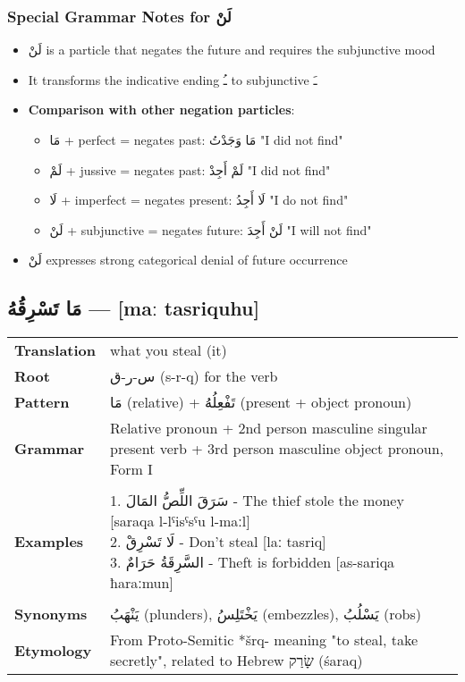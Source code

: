 \documentclass[letterpaper,12pt]{article}
\begin{document}
\subsubsection*{Special Grammar Notes for \textarabic{لَنْ}}
\begin{itemize}
  \item \textarabic{لَنْ} is a particle that negates the future and requires the subjunctive mood
  \item It transforms the indicative ending \textarabic{ـُ} to subjunctive \textarabic{ـَ}
  \item \textbf{Comparison with other negation particles}:
    \begin{itemize}
      \item \textarabic{مَا} + perfect = negates past: \textarabic{مَا وَجَدْتُ} "I did not find"
      \item \textarabic{لَمْ} + jussive = negates past: \textarabic{لَمْ أَجِدْ} "I did not find"  
      \item \textarabic{لَا} + imperfect = negates present: \textarabic{لَا أَجِدُ} "I do not find"
      \item \textarabic{لَنْ} + subjunctive = negates future: \textarabic{لَنْ أَجِدَ} "I will not find"
    \end{itemize}
  \item \textarabic{لَنْ} expresses strong categorical denial of future occurrence
\end{itemize}

\subsection{\textarabic{مَا تَسْرِقُهُ} — [maː tasriquhu]}

\begin{tabular}{p{3cm}p{10cm}}
\toprule
\textbf{Translation} & what you steal (it) \\
\textbf{Root} & \textarabic{س-ر-ق} (s-r-q) for the verb \\
\textbf{Pattern} & \textarabic{مَا} (relative) + \textarabic{تَفْعِلُهُ} (present + object pronoun) \\
\textbf{Grammar} & Relative pronoun + 2nd person masculine singular present verb + 3rd person masculine object pronoun, Form I \\
\midrule \\
\textbf{Examples} & \makecell[l]{\parbox{9.5cm}{
1. \textarabic{سَرَقَ اللِّصُّ المَالَ} - The thief stole the money [saraqa l-lˤisˤsˤu l-maːl]\\
2. \textarabic{لَا تَسْرِقْ} - Don't steal [laː tasriq]\\
3. \textarabic{السَّرِقَةُ حَرَامٌ} - Theft is forbidden [as-sariqa ħaraːmun]
}} \\
\midrule \\
\textbf{Synonyms} & \textarabic{يَنْهَبُ} (plunders), \textarabic{يَخْتَلِسُ} (embezzles), \textarabic{يَسْلُبُ} (robs) \\
\textbf{Etymology} & From Proto-Semitic *šrq- meaning "to steal, take secretly", related to Hebrew \texthebrew{שָׂרַק} (śaraq) \\
\bottomrule
\end{tabular}
\end{document}
